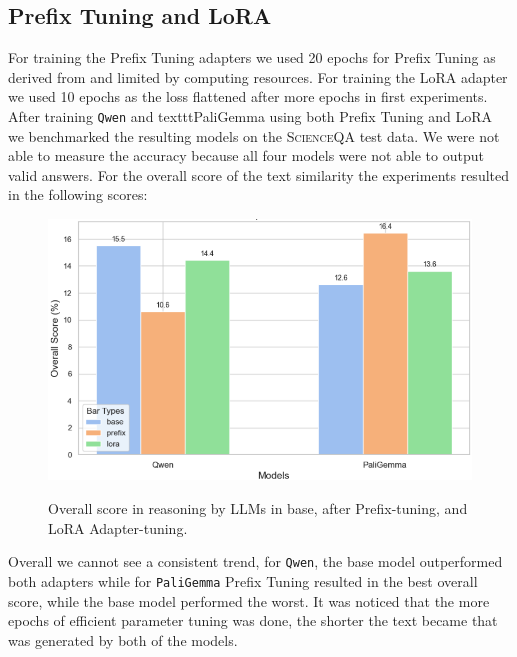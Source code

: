 \documentclass{article}
\begin{document}
\subsection{Prefix Tuning and LoRA}
For training the Prefix Tuning adapters we used 20 epochs for Prefix Tuning as derived from \cite{li2021prefix} and limited by computing resources. 
For training the LoRA adapter we used 10 epochs as the loss flattened after more epochs in first experiments.
After training \texttt{Qwen} and texttt{PaliGemma} using both Prefix Tuning and LoRA we benchmarked the resulting models on the \textsc{ScienceQA} test data. We were not able to measure the accuracy because all four models were not able to output valid answers. For the overall score of the text similarity the experiments resulted in the following scores:
\begin{figure} [H]
    \centering
    \includegraphics[width=1\linewidth]{prefix_lora_test.png}
    \label{fig:prefix_lora_test}
    \caption{Overall score in reasoning by LLMs in base, after Prefix-tuning, and LoRA Adapter-tuning.}
\end{figure}
Overall we cannot see a consistent trend, for \texttt{Qwen}, the base model outperformed both adapters while for \texttt{PaliGemma} Prefix Tuning resulted in the best overall score, while the base model performed the worst. It was noticed that the more epochs of efficient parameter tuning was done, the shorter the text became that was generated by both of the models. 
\end{document}
